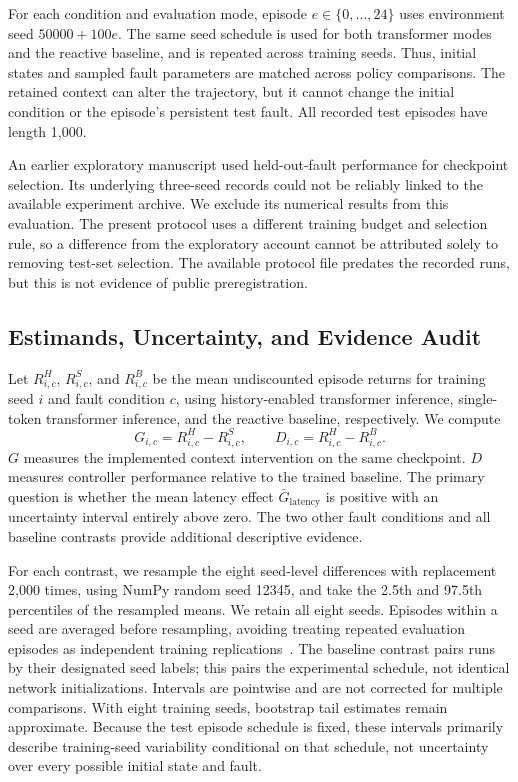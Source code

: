 \documentclass[runningheads]{llncs}
\begin{document}
For each condition and evaluation mode, episode $e\in\{0,\ldots,24\}$ uses environment seed $50000+100e$. The same seed schedule is used for both transformer modes and the reactive baseline, and is repeated across training seeds. Thus, initial states and sampled fault parameters are matched across policy comparisons. The retained context can alter the trajectory, but it cannot change the initial condition or the episode's persistent test fault. All recorded test episodes have length 1,000.

An earlier exploratory manuscript used held-out-fault performance for checkpoint selection. Its underlying three-seed records could not be reliably linked to the available experiment archive. We exclude its numerical results from this evaluation. The present protocol uses a different training budget and selection rule, so a difference from the exploratory account cannot be attributed solely to removing test-set selection. The available protocol file predates the recorded runs, but this is not evidence of public preregistration.

\subsection{Estimands, Uncertainty, and Evidence Audit}
Let $R_{i,c}^{H}$, $R_{i,c}^{S}$, and $R_{i,c}^{B}$ be the mean undiscounted episode returns for training seed $i$ and fault condition $c$, using history-enabled transformer inference, single-token transformer inference, and the reactive baseline, respectively. We compute
\begin{equation}
 G_{i,c}=R_{i,c}^{H}-R_{i,c}^{S},\qquad
 D_{i,c}=R_{i,c}^{H}-R_{i,c}^{B}.
 \label{eq:effects}
\end{equation}
$G$ measures the implemented context intervention on the same checkpoint. $D$ measures controller performance relative to the trained baseline. The primary question is whether the mean latency effect $\bar G_{\mathrm{latency}}$ is positive with an uncertainty interval entirely above zero. The two other fault conditions and all baseline contrasts provide additional descriptive evidence.

For each contrast, we resample the eight seed-level differences with replacement 2,000 times, using NumPy random seed 12345, and take the 2.5th and 97.5th percentiles of the resampled means. We retain all eight seeds. Episodes within a seed are averaged before resampling, avoiding treating repeated evaluation episodes as independent training replications~\cite{empirical}. The baseline contrast pairs runs by their designated seed labels; this pairs the experimental schedule, not identical network initializations. Intervals are pointwise and are not corrected for multiple comparisons. With eight training seeds, bootstrap tail estimates remain approximate. Because the test episode schedule is fixed, these intervals primarily describe training-seed variability conditional on that schedule, not uncertainty over every possible initial state and fault.
\end{document}
